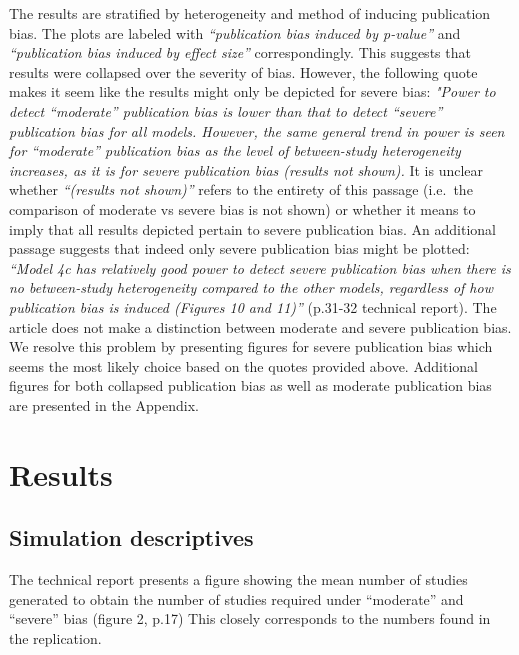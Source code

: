 \documentclass[
  english,
  doc,floatsintext,draftall]{apa6}
\begin{document}
The results are stratified by heterogeneity and method of inducing publication bias.
The plots are labeled with \emph{\enquote{publication bias induced by p-value}} and \emph{\enquote{publication bias induced by effect size}} correspondingly.
This suggests that results were collapsed over the severity of bias.
However, the following quote makes it seem like the results might only be depicted for severe bias:
\emph{"Power to detect \enquote{moderate} publication bias is lower than that to detect \enquote{severe} publication bias for all models. However, the same general trend in power is seen for \enquote{moderate} publication bias as the level of between-study heterogeneity increases, as it is for severe publication bias (results not shown).}
It is unclear whether \emph{\enquote{(results not shown)}} refers to the entirety of this passage (i.e.~the comparison of moderate vs severe bias is not shown) or whether it means to imply that all results depicted pertain to severe publication bias.
An additional passage suggests that indeed only severe publication bias might be plotted: \emph{\enquote{Model 4c has relatively good power to detect severe publication bias when there is no between-study heterogeneity compared to the other models, regardless of how publication bias is induced (Figures 10 and 11)}} (p.31-32 technical report). The article does not make a distinction between moderate and severe publication bias.
We resolve this problem by presenting figures for severe publication bias which seems the most likely choice based on the quotes provided above.
Additional figures for both collapsed publication bias as well as moderate publication bias are presented in the Appendix.

\hypertarget{results}{%
\section{Results}\label{results}}

\hypertarget{simulation-descriptives}{%
\subsection{Simulation descriptives}\label{simulation-descriptives}}

The technical report presents a figure showing the mean number of studies generated to obtain the number of studies required under \enquote{moderate} and \enquote{severe} bias (figure 2, p.17)
This closely corresponds to the numbers found in the replication.
\end{document}

